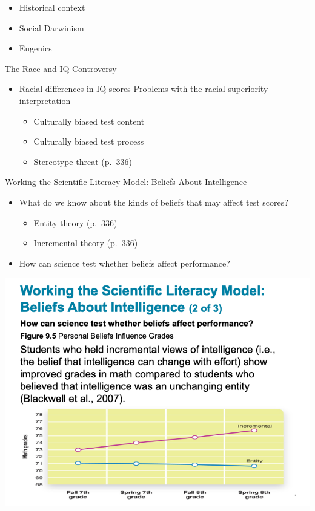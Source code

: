 \documentclass[
]{book}
\providecommand{\tightlist}{%
  \setlength{\itemsep}{0pt}\setlength{\parskip}{0pt}}
\begin{document}
\begin{reflect}
\begin{itemize}
  \begin{itemize}
  \tightlist
  \item
    Historical context\\
  \item
    Social Darwinism\\
  \item
    Eugenics
  \end{itemize}
\end{itemize}

The Race and IQ Controversy

\begin{itemize}
\tightlist
\item
  Racial differences in IQ scores Problems with the racial superiority interpretation

  \begin{itemize}
  \tightlist
  \item
    Culturally biased test content\\
  \item
    Culturally biased test process\\
  \item
    Stereotype threat (p.~336)
  \end{itemize}
\end{itemize}

Working the Scientific Literacy Model: Beliefs About Intelligence

\begin{itemize}
\tightlist
\item
  What do we know about the kinds of beliefs that may affect test scores?

  \begin{itemize}
  \tightlist
  \item
    Entity theory (p.~336)\\
  \item
    Incremental theory (p.~336)\\
  \end{itemize}
\item
  How can science test whether beliefs affect performance?
\end{itemize}

\includegraphics{assets/unit_2/slide_19.png}


\end{reflect}
\end{document}
